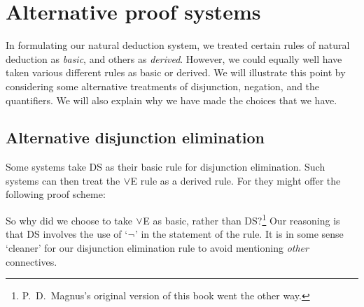 
\chapter{Alternative proof systems}
In formulating our natural deduction system, we treated certain rules of natural deduction as \emph{basic}, and others as \emph{derived}. However, we could equally well have taken various different rules as basic or derived. We will illustrate this point by considering some alternative treatments of disjunction, negation, and the quantifiers. We will also explain why we have made the choices that we have.


\section{Alternative disjunction elimination}
Some systems take DS as their basic rule for disjunction elimination. Such systems can then treat the $\vee$E rule as a derived rule. For they might offer the following proof scheme: 
\begin{fitchproof}
  \open
     {}
  \close
  \open
  \close
  \open
    \open
    \close
  \close
\end{fitchproof}
So why did we choose to take $\vee$E as basic, rather than DS?\footnote{P.~D.\ Magnus's original version of this book went the other way.} Our reasoning is that DS involves the use of `$\neg$' in the statement of the rule. It is in some sense `cleaner' for our disjunction elimination rule to avoid mentioning \emph{other} connectives.


